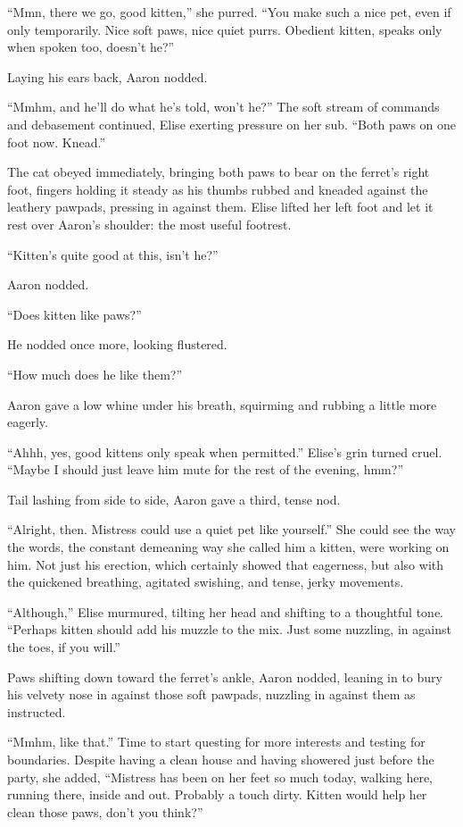 ``Mmn, there we go, good kitten,'' she purred. ``You make such a nice pet, even if only temporarily. Nice soft paws, nice quiet purrs. Obedient kitten, speaks only when spoken too, doesn't he?''

Laying his ears back, Aaron nodded.

``Mmhm, and he'll do what he's told, won't he?'' The soft stream of commands and debasement continued, Elise exerting pressure on her sub. ``Both paws on one foot now. Knead.''

The cat obeyed immediately, bringing both paws to bear on the ferret's right foot, fingers holding it steady as his thumbs rubbed and kneaded against the leathery pawpads, pressing in against them. Elise lifted her left foot and let it rest over Aaron's shoulder: the most useful footrest.

``Kitten's quite good at this, isn't he?''

Aaron nodded.

``Does kitten like paws?''

He nodded once more, looking flustered.

``How much does he like them?''

Aaron gave a low whine under his breath, squirming and rubbing a little more eagerly.

``Ahhh, yes, good kittens only speak when permitted.'' Elise's grin turned cruel. ``Maybe I should just leave him mute for the rest of the evening, hmm?''

Tail lashing from side to side, Aaron gave a third, tense nod.

``Alright, then. Mistress could use a quiet pet like yourself.'' She could see the way the words, the constant demeaning way she called him a kitten, were working on him. Not just his erection, which certainly showed that eagerness, but also with the quickened breathing, agitated swishing, and tense, jerky movements.

``Although,'' Elise murmured, tilting her head and shifting to a thoughtful tone. ``Perhaps kitten should add his muzzle to the mix. Just some nuzzling, in against the toes, if you will.''

Paws shifting down toward the ferret's ankle, Aaron nodded, leaning in to bury his velvety nose in against those soft pawpads, nuzzling in against them as instructed.

``Mmhm, like that.'' Time to start questing for more interests and testing for boundaries. Despite having a clean house and having showered just before the party, she added, ``Mistress has been on her feet so much today, walking here, running there, inside and out. Probably a touch dirty. Kitten would help her clean those paws, don't you think?''

